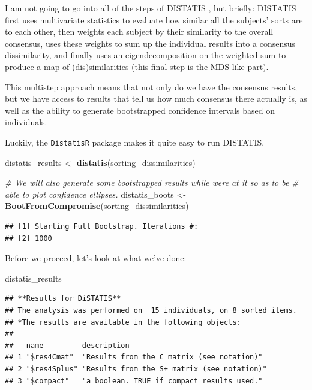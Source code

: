 \documentclass[
]{book}
\newenvironment{Shaded}{\begin{snugshade}}{\end{snugshade}}
\newcommand{\CommentTok}[1]{\textcolor[rgb]{0.56,0.35,0.01}{\textit{#1}}}
\newcommand{\FunctionTok}[1]{\textcolor[rgb]{0.13,0.29,0.53}{\textbf{#1}}}
\newcommand{\NormalTok}[1]{#1}
\newcommand{\OtherTok}[1]{\textcolor[rgb]{0.56,0.35,0.01}{#1}}
\begin{document}
I am not going to go into all of the steps of DISTATIS \citep[see instead][]{abdiAnalyzing2007}, but briefly: DISTATIS first uses multivariate statistics to evaluate how similar all the subjects' sorts are to each other, then weights each subject by their similarity to the overall consensus, uses these weights to sum up the individual results into a consensus dissimilarity, and finally uses an eigendecomposition on the weighted sum to produce a map of (dis)similarities (this final step is the MDS-like part).

This multistep approach means that not only do we have the consensus results, but we have access to results that tell us how much consensus there actually is, as well as the ability to generate bootstrapped confidence intervals based on individuals.

Luckily, the \texttt{DistatisR} package makes it quite easy to run DISTATIS.

\begin{Shaded}
\begin{Highlighting}[]
\NormalTok{distatis\_results }\OtherTok{\textless{}{-}} \FunctionTok{distatis}\NormalTok{(sorting\_dissimilarities)}

\CommentTok{\# We will also generate some bootstrapped results while we\textquotesingle{}re at it so as to be}
\CommentTok{\# able to plot confidence ellipses.}
\NormalTok{distatis\_boots }\OtherTok{\textless{}{-}} \FunctionTok{BootFromCompromise}\NormalTok{(sorting\_dissimilarities)}
\end{Highlighting}
\end{Shaded}

\begin{verbatim}
## [1] Starting Full Bootstrap. Iterations #: 
## [2] 1000
\end{verbatim}

Before we proceed, let's look at what we've done:

\begin{Shaded}
\begin{Highlighting}[]
\NormalTok{distatis\_results}
\end{Highlighting}
\end{Shaded}

\begin{verbatim}
## **Results for DiSTATIS**
## The analysis was performed on  15 individuals, on 8 sorted items.
## *The results are available in the following objects:
## 
##   name         description                                
## 1 "$res4Cmat"  "Results from the C matrix (see notation)" 
## 2 "$res4Splus" "Results from the S+ matrix (see notation)"
## 3 "$compact"   "a boolean. TRUE if compact results used."
\end{verbatim}
\end{document}
